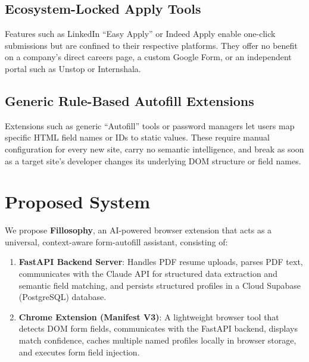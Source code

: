 \documentclass[12pt,a4paper]{report}
\begin{document}
\subsection{Ecosystem-Locked Apply Tools}
Features such as LinkedIn ``Easy Apply'' or Indeed Apply enable one-click submissions but are confined to their respective platforms. They offer no benefit on a company's direct careers page, a custom Google Form, or an independent portal such as Unstop or Internshala.

\subsection{Generic Rule-Based Autofill Extensions}
Extensions such as generic ``Autofill'' tools or password managers let users map specific HTML field names or IDs to static values. These require manual configuration for every new site, carry no semantic intelligence, and break as soon as a target site's developer changes its underlying DOM structure or field names.

\section{Proposed System}
We propose \textbf{Fillosophy}, an AI-powered browser extension that acts as a universal, context-aware form-autofill assistant, consisting of:
\begin{enumerate}
    \item \textbf{FastAPI Backend Server}: Handles PDF resume uploads, parses PDF text, communicates with the Claude API for structured data extraction and semantic field matching, and persists structured profiles in a Cloud Supabase (PostgreSQL) database.
    \item \textbf{Chrome Extension (Manifest V3)}: A lightweight browser tool that detects DOM form fields, communicates with the FastAPI backend, displays match confidence, caches multiple named profiles locally in browser storage, and executes form field injection.
\end{enumerate}
\end{document}
